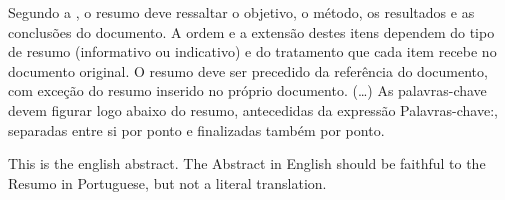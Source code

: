 
\begin{resumo}
 Segundo a , o resumo deve ressaltar o
 objetivo, o método, os resultados e as conclusões do documento. A ordem e a extensão
 destes itens dependem do tipo de resumo (informativo ou indicativo) e do
 tratamento que cada item recebe no documento original. O resumo deve ser
 precedido da referência do documento, com exceção do resumo inserido no
 próprio documento. (\ldots) As palavras-chave devem figurar logo abaixo do
 resumo, antecedidas da expressão Palavras-chave:, separadas entre si por
 ponto e finalizadas também por ponto.
\end{resumo}

\begin{Abstract}
 This is the english abstract. The Abstract in English should be faithful to the
 Resumo in Portuguese, but not a literal translation.
\end{Abstract}
